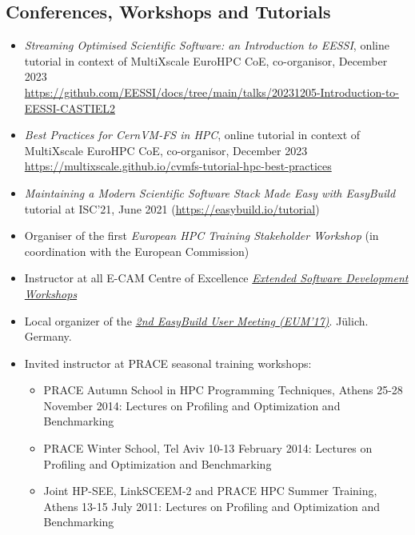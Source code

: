 \subsection*{Conferences, Workshops and Tutorials}
\begin{itemize}
\item[] \emph{Streaming Optimised Scientific Software: an Introduction to EESSI}, online tutorial in context of
    MultiXscale EuroHPC CoE, co-organisor, December 2023
        \\{\small{\url{https://github.com/EESSI/docs/tree/main/talks/20231205-Introduction-to-EESSI-CASTIEL2}}}
\item[] \emph{Best Practices for CernVM-FS in HPC}, online tutorial in context of MultiXscale EuroHPC CoE, co-organisor, December 2023
        \\{\small{\url{https://multixscale.github.io/cvmfs-tutorial-hpc-best-practices}}}
\item[] \emph{Maintaining a Modern Scientific Software Stack Made Easy with EasyBuild} tutorial at ISC'21, June 2021 (\url{https://easybuild.io/tutorial})
\item[] Organiser of the first \emph{European HPC Training Stakeholder Workshop} (in coordination with the European Commission)
\item[] Instructor at all E-CAM Centre of Excellence \emph{\href{https://www.e-cam2020.eu/events?tribe_paged=1&tribe_event_display=list&tribe-bar-date=2015-10-01&tribe-bar-search=Extended}{Extended Software Development Workshops}}
\item[] Local organizer of the \emph{\href{https://github.com/easybuilders/easybuild/wiki/2nd-EasyBuild-User-Meeting}{2nd EasyBuild User Meeting (EUM'17)}}. J\"ulich. Germany.
\item[]Invited instructor at PRACE seasonal training workshops:
\begin{itemize}
\item[]  PRACE Autumn School in HPC Programming Techniques, Athens 25-28 November 2014: Lectures on Profiling and Optimization and Benchmarking
\item[]  PRACE Winter School, Tel Aviv 10-13 February 2014: Lectures on Profiling and Optimization and Benchmarking
\item[] Joint HP-SEE, LinkSCEEM-2 and PRACE HPC Summer Training, Athens 13-15 July 2011: Lectures on Profiling and Optimization and Benchmarking
\end{itemize}
\end{itemize}

